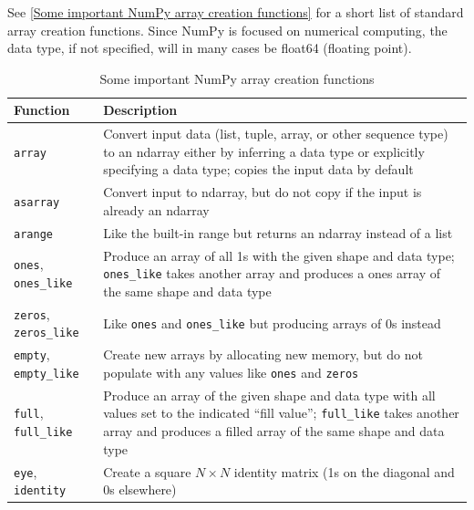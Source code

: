 See \autoref{Some important NumPy array creation functions} for a short list of standard array creation functions. Since NumPy is focused on numerical computing, the data type, if not specified, will in many cases be float64 (floating point).

\begin{table}
    \caption{Some important NumPy array creation functions}
    \label{Some important NumPy array creation functions}
    \begin{tabularx}{\textwidth}{lX}
        \hline
        Function                        & Description                                                                                                                                                                                          \\
        \hline
        \verb|array|                    & Convert input data (list, tuple, array, or other sequence type) to an ndarray either by inferring a data
        type or explicitly specifying a data type; copies the input data by default                                                                                                                                                            \\
        \verb|asarray|                  & Convert input to ndarray, but do not copy if the input is already an ndarray                                                                                                                         \\
        \verb|arange|                   & Like the built-in range but returns an ndarray instead of a list                                                                                                                                     \\
        \verb|ones|, \verb|ones_like|   & Produce an array of all 1s with the given shape and data type; \verb|ones_like| takes another array and produces a ones array of the same shape and data type                                        \\
        \verb|zeros|, \verb|zeros_like| & Like \verb|ones| and \verb|ones_like| but producing arrays of 0s instead                                                                                                                             \\
        \verb|empty|, \verb|empty_like| & Create new arrays by allocating new memory, but do not populate with any values like \verb|ones| and \verb|zeros|                                                                                    \\
        \verb|full|, \verb|full_like|   & Produce an array of the given shape and data type with all values set to the indicated “fill value”; \verb|full_like| takes another array and produces a filled array of the same shape and data type \\
        \verb|eye|, \verb|identity|     & Create a square $N \times N$ identity matrix (1s on the diagonal and 0s elsewhere)                                                                                                                   \\
        \hline
    \end{tabularx}
\end{table}
